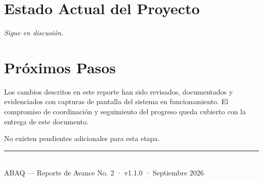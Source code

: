 \documentclass[12pt, a4paper]{article}
\begin{document}
\section{Estado Actual del Proyecto}

\begin{center}
  \vspace{2cm}
  {\Large\color{darkgray}\itshape Sigue en discusión.}
  \vspace{2cm}
\end{center}

\newpage
\section{Próximos Pasos}

Los cambios descritos en este reporte han sido revisados, documentados y evidenciados con capturas de pantalla del sistema en funcionamiento. El compromiso de coordinación y seguimiento del progreso queda cubierto con la entrega de este documento.

No existen pendientes adicionales para esta etapa.

\vfill
\begin{center}
  \rule{0.5\textwidth}{0.4pt}\\[0.5em]
  {\small\color{darkgray} ABAQ — Reporte de Avance No. 2 · v1.1.0 · Septiembre 2026}
\end{center}
\end{document}

